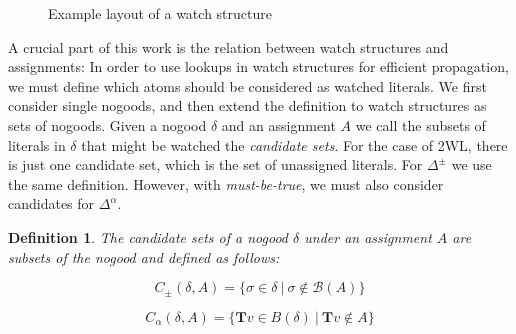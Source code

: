 \documentclass{vutinfth} %
\newtheorem{definition}{Definition}[chapter]
\newcommand{\mbt}{must-be-true\xspace}
\newcommand{\bass}{\mathcal{B}}
\newcommand{\ass}{A}
\newcommand{\bT}{\mathbf{T}}
\newcommand{\bX}{\mathbf{X}}
\newcommand{\cdpm}{C_\pm}
\newcommand{\cdal}{C_\alpha}
\newcommand{\dpm}{\Delta^\pm}
\newcommand{\dal}{\Delta^\alpha}
\newcommand{\bodyf}{B}
\newcommand{\bsgl}{\sigma}
\begin{document}
\begin{figure}
  \centering
{}
  \caption{Example layout of a watch structure}
  \label{fig:watches} %
\end{figure}

A crucial part of this work is the relation between watch structures and assignments: In order to use lookups in watch structures for efficient propagation, we must define which atoms should be considered as watched literals. We first consider single nogoods, and then extend the definition to watch structures as sets of nogoods. Given a nogood $\delta$ and an assignment $\ass$ we call the subsets of literals in $\delta$ that might be watched the \emph{candidate sets}. For the case of 2WL, there is just one candidate set, which is the set of unassigned literals. For $\dpm$ we use the same definition. However, with \emph{\mbt}, we must also consider candidates for $\dal$.


\begin{definition}
The \emph{candidate sets} of a nogood $\delta$ under an assignment $A$ are subsets of the nogood  and defined as follows:

$$\cdpm(\delta, A) = \{\bsgl \in \delta \ | \ \bsgl \not \in \bass(\ass) \}$$

$$\cdal(\delta, A) = \{ \bT v \in \bodyf(\delta) \ | \ \bT v \not \in \ass \}$$
\end{definition}
\end{document}
